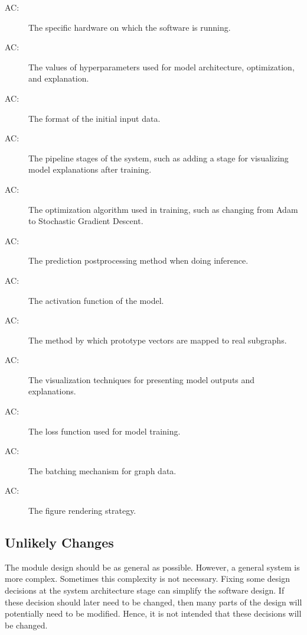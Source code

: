 \documentclass[12pt, titlepage]{article}
\newcounter{acnum}
\newcommand{\actheacnum}{AC\theacnum}
\begin{document}
\begin{description}
\item[ \actheacnum \label{acHardware}:] The specific
  hardware on which the software is running.
\item[ \actheacnum \label{acConfig}:]  The values of hyperparameters used for model architecture, optimization, and explanation.
\item[ \actheacnum \label{acInput}:] The format of the
  initial input data.
\item[ \actheacnum \label{acControl}:] The pipeline stages of the system, such as adding a stage for visualizing model explanations after training.

\item[ \actheacnum \label{acTrain}:] The optimization algorithm used in training, such as changing from Adam to Stochastic Gradient Descent.
\item[ \actheacnum \label{acInf}:] The prediction postprocessing method when doing inference. 
\item[ \actheacnum \label{acModel}:] The activation function of the model.
\item[ \actheacnum \label{acExp}:] The method by which prototype vectors are mapped to real subgraphs.
\item[ \actheacnum \label{acVil}:] The visualization techniques for presenting model outputs and explanations.
\item[ \actheacnum \label{acTorch}:] The loss function used for model training.
\item[ \actheacnum \label{acPyG}:] The batching mechanism for graph data.
\item[ \actheacnum \label{acGUI}:] The figure rendering strategy.
\end{description}

\subsection{Unlikely Changes} \label{SecUchange}

The module design should be as general as possible. However, a general system is
more complex. Sometimes this complexity is not necessary. Fixing some design
decisions at the system architecture stage can simplify the software design. If
these decision should later need to be changed, then many parts of the design
will potentially need to be modified. Hence, it is not intended that these
decisions will be changed.
\end{document}
